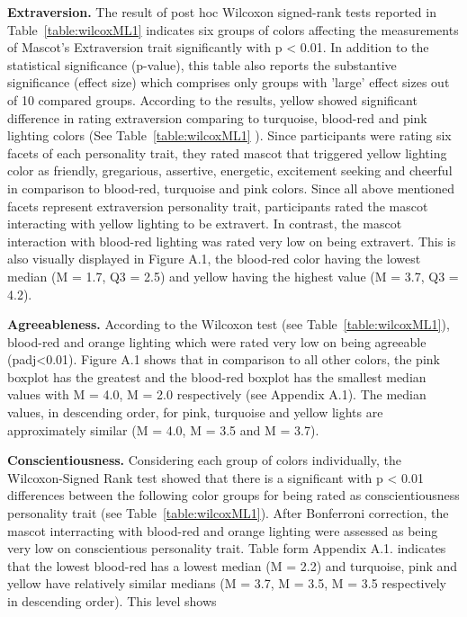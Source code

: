 \par \textbf{Extraversion.} The result of post hoc Wilcoxon signed-rank tests reported in Table~\ref{table:wilcoxML1}
indicates six groups of colors affecting the measurements of Mascot’s Extraversion trait significantly with p < 0.01.
In addition to the statistical significance (p-value), this table also reports the substantive significance (effect size)
which comprises only groups with 'large' effect sizes out of 10 compared groups. According to the results, yellow
showed significant difference in rating extraversion comparing to turquoise, blood-red and pink lighting colors
(See Table~\ref{table:wilcoxML1} ). Since participants were rating six facets of each personality trait, they rated
mascot that triggered yellow lighting color as friendly, gregarious, assertive, energetic, excitement seeking and
cheerful in comparison to blood-red, turquoise and pink colors. Since all above mentioned facets represent extraversion
personality trait, participants rated the mascot interacting with yellow lighting to be extravert.
In contrast, the mascot interaction with blood-red lighting was rated very low on being extravert. This is also visually
displayed in Figure A.1, the blood-red color having the lowest median (M = 1.7, Q3 = 2.5) and yellow having the highest
value (M = 3.7, Q3 = 4.2).
\par \textbf{Agreeableness.} According to the Wilcoxon test (see Table~\ref{table:wilcoxML1}), blood-red and orange
lighting which were rated very low on being agreeable (padj<0.01). Figure A.1 shows that in comparison to all other colors,
the pink boxplot has the greatest and the blood-red boxplot has the smallest median values with M = 4.0, M = 2.0
respectively (see Appendix A.1). The median values, in descending order, for pink, turquoise and yellow lights are
approximately similar (M = 4.0, M = 3.5 and M = 3.7).
\par \textbf{Conscientiousness.} Considering each group of colors individually, the Wilcoxon-Signed Rank test showed
that there is a significant with p < 0.01 differences between the following color groups for being rated as
conscientiousness personality trait (see Table~\ref{table:wilcoxML1}). After Bonferroni correction, the mascot
interracting with blood-red and orange lighting were assessed as being very low on conscientious personality trait.
Table form Appendix A.1. indicates that the lowest blood-red has a lowest median (M = 2.2) and turquoise, pink and
yellow have relatively similar medians (M = 3.7, M = 3.5, M = 3.5 respectively in descending order). This level shows
